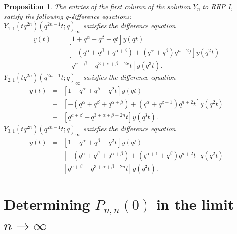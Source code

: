 \documentclass[a4paper,reqno]{amsart}
\numberwithin{equation}{section}
\newtheorem{proposition}[theorem]{Proposition}
\numberwithin{figure}{section}
\begin{document}
\begin{proposition}
The entries of the first column of the solution $Y_n$ to RHP I, satisfy the following $q$-difference equations:\\
$Y_{1,1}(tq^{2n})(q^{2n+1}t;q)_\infty$ satisfies the difference equation
\begin{eqnarray}
y(t) &=& \left[ 1+q^\alpha + q^\beta-qt\right]y(qt) \nonumber \\
&+& \left[-(q^\alpha + q^\beta + q^{\alpha+\beta}) + (q^\alpha+q^\beta)q^{n+2}t\right]y(q^2t) \nonumber \\
&+& \left[ q^{\alpha+\beta}-q^{3+\alpha+\beta+2n}t\right]y(q^3t).
\label{1st diff v3}
\end{eqnarray}
$Y_{2,1}(tq^{2n})(q^{2n+1}t;q)_\infty$  satisfies the difference equation
\begin{eqnarray}
y(t) &=& \left[ 1+q^\alpha + q^\beta-q^{2}t \right]y(qt) \nonumber \\
&+& \left[-(q^\alpha + q^\beta + q^{\alpha+\beta}) + \left(q^\alpha + q^{\beta +1}\right)q^{n+2}t \right]y(q^2t) \nonumber \\
&+& \left[ q^{\alpha+\beta}-q^{3+\alpha+\beta+2n}t\right]y(q^3t). \label{2nd diff v3}
\end{eqnarray}
$Y_{3,1}(tq^{2n})(q^{2n+1}t;q)_\infty$  satisfies the difference equation
\begin{eqnarray}
y(t) &=& \left[ 1+q^\alpha + q^\beta-q^{2}t \right]y(qt) \nonumber \\
&+& \left[-(q^\alpha + q^\beta + q^{\alpha+\beta}) + \left(q^{\alpha+1} + q^{\beta}\right)q^{n+2}t \right]y(q^2t) \nonumber \\
&+& \left[ q^{\alpha+\beta}-q^{3+\alpha+\beta+2n}t\right]y(q^3t). \label{3rd diff v3}
\end{eqnarray}
\end{proposition}



\section{Determining $P_{n,n}(0)$ in the limit $n\to\infty$}\label{Sect 3}
\end{document}
